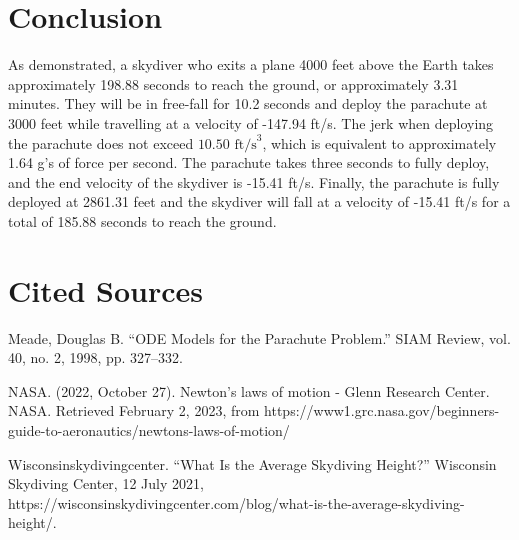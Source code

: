 \documentclass{article}
\begin{document}
    \section*{Conclusion}
    As demonstrated, a skydiver who exits a plane 4000 feet above the Earth takes approximately 198.88 seconds to reach the ground, or approximately 3.31 minutes. They will be in free-fall for 10.2 seconds and deploy the parachute at 3000 feet while travelling at a velocity of -147.94 ft/s. The jerk when deploying the parachute does not exceed $10.50 \text{ ft/s}^3$, which is equivalent to approximately 1.64 g's of force per second. The parachute takes three seconds to fully deploy, and the end velocity of the skydiver is -15.41 ft/s. Finally, the parachute is fully deployed at 2861.31 feet and the skydiver will fall at a velocity of -15.41 ft/s for a total of 185.88 seconds to reach the ground.

    \newpage
    \section*{Cited Sources}
    Meade, Douglas B. “ODE Models for the Parachute Problem.” SIAM Review, vol. 40, no. 2, 1998, pp. 327–332.  
    \newline

NASA. (2022, October 27). Newton's laws of motion - Glenn Research Center. NASA. Retrieved February 2, 2023, from https://www1.grc.nasa.gov/beginners-guide-to-aeronautics/newtons-laws-of-motion/  
\newline

Wisconsinskydivingcenter. “What Is the Average Skydiving Height?” Wisconsin Skydiving Center, 12 July 2021, https://wisconsinskydivingcenter.com/blog/what-is-the-average-skydiving-height/. 
\end{document}
